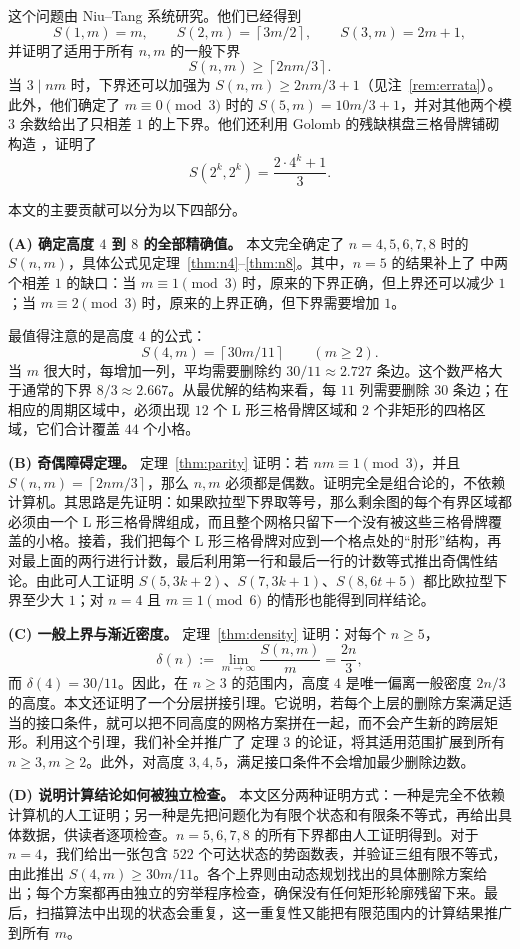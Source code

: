 \documentclass[11pt]{ctexart}
\theoremstyle{definition}
\newcommand{\ceil}[1]{\left\lceil #1 \right\rceil}
\begin{document}
这个问题由 Niu--Tang \cite{NT25} 系统研究。他们已经得到
\[
S(1,m)=m,\qquad
S(2,m)=\ceil{3m/2},\qquad
S(3,m)=2m+1,
\]
并证明了适用于所有 $n,m$ 的一般下界
\[
S(n,m)\ge\ceil{2nm/3}.
\]
当 $3\mid nm$ 时，下界还可以加强为 $S(n,m)\ge2nm/3+1$（见注~\ref{rem:errata}）。此外，他们确定了 $m\equiv0\pmod3$ 时的 $S(5,m)=10m/3+1$，并对其他两个模 $3$ 余数给出了只相差 $1$ 的上下界。他们还利用 Golomb 的残缺棋盘三格骨牌铺砌构造 \cite{Golomb54}，证明了
\[
S(2^k,2^k)=\frac{2\cdot4^k+1}{3}.
\]

本文的主要贡献可以分为以下四部分。

\smallskip
\noindent\textbf{(A) 确定高度 $4$ 到 $8$ 的全部精确值。}
本文完全确定了 $n=4,5,6,7,8$ 时的 $S(n,m)$，具体公式见定理~\ref{thm:n4}--\ref{thm:n8}。其中，$n=5$ 的结果补上了 \cite{NT25} 中两个相差 $1$ 的缺口：当 $m\equiv1\pmod3$ 时，原来的下界正确，但上界还可以减少 $1$；当 $m\equiv2\pmod3$ 时，原来的上界正确，但下界需要增加 $1$。

最值得注意的是高度 $4$ 的公式：
\[
S(4,m)=\ceil{30m/11}\qquad(m\ge2).
\]
当 $m$ 很大时，每增加一列，平均需要删除约 $30/11\approx2.727$ 条边。这个数严格大于通常的下界 $8/3\approx2.667$。从最优解的结构来看，每 $11$ 列需要删除 $30$ 条边；在相应的周期区域中，必须出现 $12$ 个 L 形三格骨牌区域和 $2$ 个非矩形的四格区域，它们合计覆盖 $44$ 个小格。

\smallskip
\noindent\textbf{(B) 奇偶障碍定理。}
定理~\ref{thm:parity} 证明：若 $nm\equiv1\pmod3$，并且
$S(n,m)=\ceil{2nm/3}$，那么 $n,m$ 必须都是偶数。证明完全是组合论的，不依赖计算机。其思路是先证明：如果欧拉型下界取等号，那么剩余图的每个有界区域都必须由一个 L 形三格骨牌组成，而且整个网格只留下一个没有被这些三格骨牌覆盖的小格。接着，我们把每个 L 形三格骨牌对应到一个格点处的“肘形”结构，再对最上面的两行进行计数，最后利用第一行和最后一行的计数等式推出奇偶性结论。由此可人工证明 $S(5,3k+2)$、$S(7,3k+1)$、$S(8,6t+5)$ 都比欧拉型下界至少大 $1$；对 $n=4$ 且 $m\equiv1\pmod6$ 的情形也能得到同样结论。

\smallskip
\noindent\textbf{(C) 一般上界与渐近密度。}
定理~\ref{thm:density} 证明：对每个 $n\ge5$，
\[
\delta(n):=\lim_{m\to\infty}\frac{S(n,m)}m=\frac{2n}{3},
\]
而 $\delta(4)=30/11$。因此，在 $n\ge3$ 的范围内，高度 $4$ 是唯一偏离一般密度 $2n/3$ 的高度。本文还证明了一个分层拼接引理。它说明，若每个上层的删除方案满足适当的接口条件，就可以把不同高度的网格方案拼在一起，而不会产生新的跨层矩形。利用这个引理，我们补全并推广了 \cite{NT25} 定理 3 的论证，将其适用范围扩展到所有 $n\ge3,m\ge2$。此外，对高度 $3,4,5$，满足接口条件不会增加最少删除边数。

\smallskip
\noindent\textbf{(D) 说明计算结论如何被独立检查。}
本文区分两种证明方式：一种是完全不依赖计算机的人工证明；另一种是先把问题化为有限个状态和有限条不等式，再给出具体数据，供读者逐项检查。$n=5,6,7,8$ 的所有下界都由人工证明得到。对于 $n=4$，我们给出一张包含 $522$ 个可达状态的势函数表，并验证三组有限不等式，由此推出 $S(4,m)\ge30m/11$。各个上界则由动态规划找出的具体删除方案给出；每个方案都再由独立的穷举程序检查，确保没有任何矩形轮廓残留下来。最后，扫描算法中出现的状态会重复，这一重复性又能把有限范围内的计算结果推广到所有 $m$。
\end{document}

